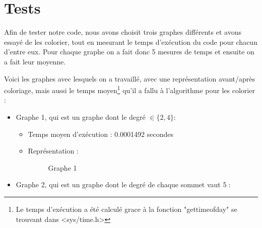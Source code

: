 \documentclass[a4paper, 11pt, oneside]{article}
\begin{document}
	\section{Tests}
	Afin de tester notre code, nous avons choisit trois graphes différents et avons essayé de les colorier, tout en mesurant le temps d'exécution du code pour chacun d'entre eux. Pour chaque graphe on a fait donc 5 mesures de temps et ensuite on a fait leur moyenne. \par
	Voici les graphes avec lesquels on a travaillé, avec une représentation avant/après coloriage, mais aussi le temps moyen\footnote{Le temps d'exécution a été calculé grace à la fonction "gettimeofday" se trouvant dans <sys/time.h>} qu'il a fallu à l'algorithme pour les colorier : 
	\begin{itemize}
		\item Graphe 1, qui est un graphe dont le degré $\in \{2, 4\}$:
		\begin{itemize}
			\item Temps moyen d'exécution : 0.0001492 secondes
			\item Représentation :
			\begin{figure}[h]%
				\centering
				\qquad
				\caption{Graphe 1}%
				\label{fig:graphe1}%
			\end{figure}
		\end{itemize}
		\item Graphe 2, qui est un graphe dont le degré de chaque sommet vaut 5 :
		\begin{itemize}

\end{itemize}
\end{itemize}
\end{document}
